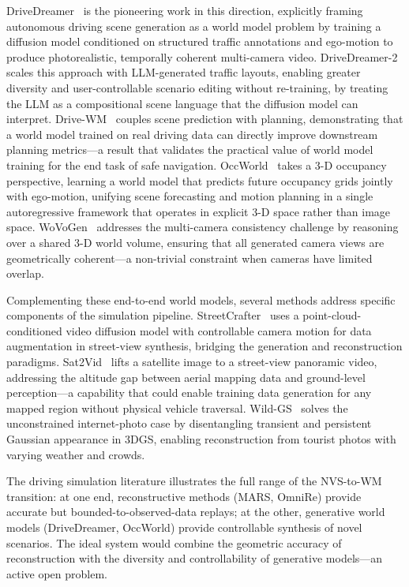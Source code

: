 DriveDreamer~\citep{wang2023drivedreamer} is the pioneering work in this
direction, explicitly framing autonomous driving scene generation as a world
model problem by training a diffusion model conditioned on structured traffic
annotations and ego-motion to produce photorealistic, temporally coherent
multi-camera video.
DriveDreamer-2~\citep{zhao2024drivedreamer2} scales this approach with
LLM-generated traffic layouts, enabling greater diversity and user-controllable
scenario editing without re-training, by treating the LLM as a compositional
scene language that the diffusion model can interpret.
Drive-WM~\citep{wang2023drive_wm} couples scene prediction with planning,
demonstrating that a world model trained on real driving data can directly
improve downstream planning metrics---a result that validates the practical
value of world model training for the end task of safe navigation.
OccWorld~\citep{zheng2024occworld} takes a 3-D occupancy perspective,
learning a world model that predicts future occupancy grids jointly with
ego-motion, unifying scene forecasting and motion planning in a single
autoregressive framework that operates in explicit 3-D space rather than
image space.
WoVoGen~\citep{lu2023wovogen} addresses the multi-camera consistency challenge
by reasoning over a shared 3-D world volume, ensuring that all generated
camera views are geometrically coherent---a non-trivial constraint when
cameras have limited overlap.

Complementing these end-to-end world models, several methods address specific
components of the simulation pipeline.
StreetCrafter~\citep{yan2024streetcrafter} uses a point-cloud-conditioned video
diffusion model with controllable camera motion for data augmentation in
street-view synthesis, bridging the generation and reconstruction paradigms.
Sat2Vid~\citep{wu2022sat2vid} lifts a satellite image to a street-view
panoramic video, addressing the altitude gap between aerial mapping data
and ground-level perception---a capability that could enable training data
generation for any mapped region without physical vehicle traversal.
Wild-GS~\citep{xu2024wildgs} solves the unconstrained internet-photo case by
disentangling transient and persistent Gaussian appearance in 3DGS,
enabling reconstruction from tourist photos with varying weather and crowds.

The driving simulation literature illustrates the full range of the NVS-to-WM
transition: at one end, reconstructive methods (MARS, OmniRe) provide accurate
but bounded-to-observed-data replays; at the other, generative world models
(DriveDreamer, OccWorld) provide controllable synthesis of novel scenarios.
The ideal system would combine the geometric accuracy of reconstruction with
the diversity and controllability of generative models---an active open problem.

